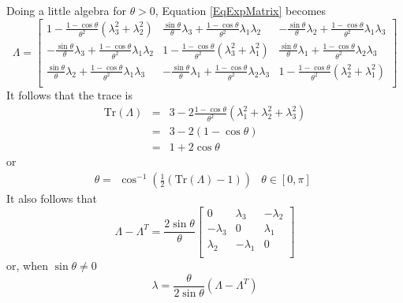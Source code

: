 \documentclass[10pt,letterpaper,oneside,notitlepage]{article}
\begin{document}
Doing a little algebra for $\theta > 0$, Equation \ref{EqExpMatrix} becomes
\begin{equation}
\label{EqMatrixAlgebra}
\Lambda =
 \begin{bmatrix}
  1-\frac{1-\cos\theta}{\theta^2}\left( \lambda_3^2 + \lambda_2^2\right) 
&   \frac{\sin\theta}{\theta}\lambda_3+\frac{1-\cos\theta}{\theta^2}\lambda_1\lambda_2  
&  -\frac{\sin\theta}{\theta}\lambda_2+\frac{1-\cos\theta}{\theta^2}\lambda_1\lambda_3 \\
   -\frac{\sin\theta}{\theta}\lambda_3+\frac{1-\cos\theta}{\theta^2}\lambda_1\lambda_2
&  1-\frac{1-\cos\theta}{\theta^2}\left( \lambda_3^2 + \lambda_1^2\right) 
&  \frac{\sin\theta}{\theta}\lambda_1+\frac{1-\cos\theta}{\theta^2}\lambda_2\lambda_3  \\
   \frac{\sin\theta}{\theta}\lambda_2+\frac{1-\cos\theta}{\theta^2}\lambda_1\lambda_3 
& -\frac{\sin\theta}{\theta}\lambda_1+\frac{1-\cos\theta}{\theta^2}\lambda_2\lambda_3 
&  1-\frac{1-\cos\theta}{\theta^2}\left( \lambda_2^2 + \lambda_1^2\right)                    \\
 \end{bmatrix}
\end{equation}
It follows that the trace is 
\begin{eqnarray*}
\mathrm{Tr}(\Lambda) &=& 3 - 2\frac{1-\cos\theta}{\theta^2}(\lambda_1^2 + \lambda_2^2 + \lambda_3^2) \\
               &=& 3 - 2\left(1-\cos\theta\right) \\
               &=& 1 + 2\cos\theta
\end{eqnarray*} or
\begin{equation}
\theta= \begin{matrix} \cos^{-1}\left(\frac{1}{2}\left(\mathrm{Tr}(\Lambda)-1\right)\right) & \theta \in \left[0,\pi\right]\end{matrix}
\end{equation}
It also follows that  
\begin{equation}
\Lambda - \Lambda^T=\frac{2\sin\theta}{\theta}
 \begin{bmatrix}
  0  &   \lambda_3  &  -\lambda_2 \\
   -\lambda_3 &  0 &  \lambda_1  \\
   \lambda_2 & -\lambda_1 &  0 \\
 \end{bmatrix}
\end{equation} or, when $\sin\theta \neq 0$
\begin{equation}
\label{EqLambdaSinNot0}
\lambda = \frac{\theta}{2\sin\theta} \left( \Lambda - \Lambda^T\right)
\end{equation}
\end{document}
